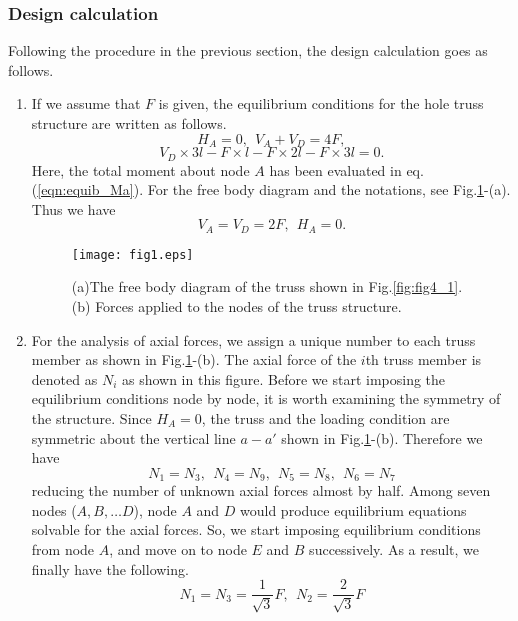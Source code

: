 \documentclass[10pt,a4j]{article}
\begin{document}
\subsubsection{Design calculation}
Following the procedure in the previous section, the design calculation goes as follows.  
\begin{enumerate}
\item
	If we assume that $F$ is given, the equilibrium conditions for the hole truss 
	structure are written as follows.
	\begin{equation}
		H_A=0, \ \ V_A+V_D=4F, 
		\label{eqn:equib_fs}
	\end{equation}
	\begin{equation}
		V_D\times 3l - F\times l-F\times 2l-F\times 3l=0.
		\label{eqn:equib_Ma}
	\end{equation}
	Here, the total moment about node $A$ has been evaluated in eq.(\ref{eqn:equib_Ma}).
	For the free body diagram and the notations, see Fig.\ref{fig:fig1}-(a).
	Thus we have 
	\begin{equation}
		V_A=V_D=2F, \ \ H_A=0.
		\label{eqn:reac_fs}
	\end{equation}
\begin{figure}[h]
	\begin{center}
	\texttt{[image: fig1.eps]} 
	\end{center}
	\caption{(a)The free body diagram of the truss shown in Fig.\ref{fig:fig4_1}. 
	(b) Forces applied to the nodes of the truss structure.} 
	\label{fig:fig1}
\end{figure}
\item
	For the analysis of axial forces, we assign a unique number to 
	each truss member as shown in Fig.\ref{fig:fig1}-(b).
	The axial force of the $i$th truss member is denoted as $N_i$ as shown in this figure.
	Before we start imposing the equilibrium conditions node by node, it is worth examining 
	the symmetry of the structure. 
	Since $H_A=0$, the truss and the loading condition are symmetric about the vertical 
	line $a-a'$ shown in Fig.\ref{fig:fig1}-(b). 
	Therefore we have 	
	\[
		N_1=N_3, \ \ N_4=N_9,\ \ N_5=N_8, \ \   N_6=N_7
	\]
	reducing the number of unknown axial forces almost by half.
	Among seven nodes ($A,B,\dots D$), node $A$ and $D$ would produce 
	equilibrium equations solvable for the axial forces. So, we start imposing 
	equilibrium conditions from node $A$, and move on to node $E$ and $B$ successively. 
	As a result, we finally have the following. 
	\[
		N_1=N_3=\frac{1}{\sqrt{3}}F ,\ \ N_2=\frac{2}{\sqrt{3}}F
\]
\end{enumerate}
\end{document}
